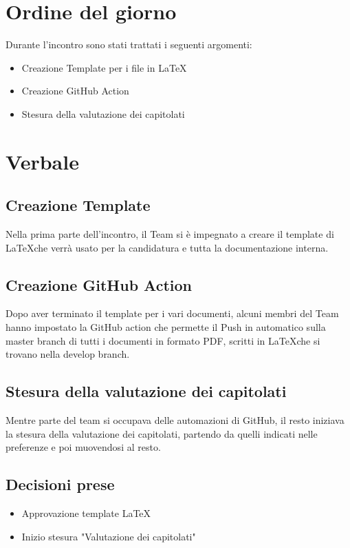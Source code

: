 \documentclass[italian, 12pt]{article}
\begin{document}
\section{Ordine del giorno}
Durante l'incontro sono stati trattati i seguenti argomenti: 
\begin{flushleft}
        \begin{itemize}
            \item Creazione Template per i file in \LaTeX
            \item Creazione GitHub Action 
            \item Stesura della valutazione dei capitolati
        \end{itemize}
\end{flushleft}
\newpage

\section{Verbale}
\subsection{Creazione Template}
Nella prima parte dell'incontro, il Team si è impegnato a creare il template di \LaTeX che verrà usato per la candidatura e tutta la documentazione interna.

\subsection{Creazione GitHub Action}
Dopo aver terminato il template per i vari documenti, alcuni membri del Team hanno impostato la GitHub action che permette il Push in automatico sulla master branch di tutti i documenti in formato PDF, scritti in \LaTeX che si trovano nella develop branch.

\subsection{Stesura della valutazione dei capitolati}
Mentre parte del team si occupava delle automazioni di GitHub, il resto iniziava la stesura della valutazione dei capitolati, partendo da quelli indicati nelle preferenze e poi muovendosi al resto. 

\subsection{Decisioni prese}
\begin{itemize}
    \item Approvazione template \LaTeX
    \item Inizio stesura "Valutazione dei capitolati"
\end{itemize}
\end{document}
